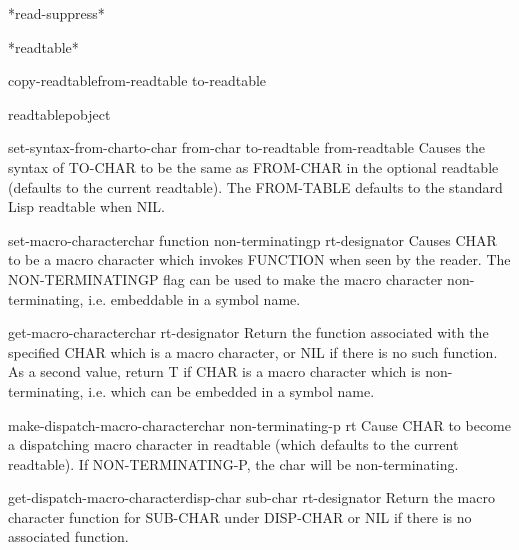 \documentclass[10pt,english]{book}
\begin{document}
\begin{variable}{*read-suppress*}{}
  
\end{variable}

\begin{variable}{*readtable*}{}
  
\end{variable}

\begin{function}{copy-readtable}{\op from-readtable to-readtable}
  
\end{function}

\begin{function}{readtablep}{object}
  
\end{function}

\begin{function}{set-syntax-from-char}{to-char from-char \op to-readtable from-readtable}
  Causes the syntax of TO-CHAR to be the same as FROM-CHAR in the optional
readtable (defaults to the current readtable). The FROM-TABLE defaults to the
standard Lisp readtable when NIL.
\end{function}

\begin{function}{set-macro-character}{char function \op non-terminatingp rt-designator}
  Causes CHAR to be a macro character which invokes FUNCTION when seen
   by the reader. The NON-TERMINATINGP flag can be used to make the macro
   character non-terminating, i.e. embeddable in a symbol name.
\end{function}

\begin{function}{get-macro-character}{char \op rt-designator}
  Return the function associated with the specified CHAR which is a macro
  character, or NIL if there is no such function. As a second value, return
  T if CHAR is a macro character which is non-terminating, i.e. which can
  be embedded in a symbol name.
\end{function}

\begin{function}{make-dispatch-macro-character}{char \op non-terminating-p rt}
  Cause CHAR to become a dispatching macro character in readtable (which
   defaults to the current readtable). If NON-TERMINATING-P, the char will
   be non-terminating.
\end{function}

\begin{function}{get-dispatch-macro-character}{disp-char sub-char \op rt-designator}
  Return the macro character function for SUB-CHAR under DISP-CHAR
   or NIL if there is no associated function.
\end{function}
\end{document}
